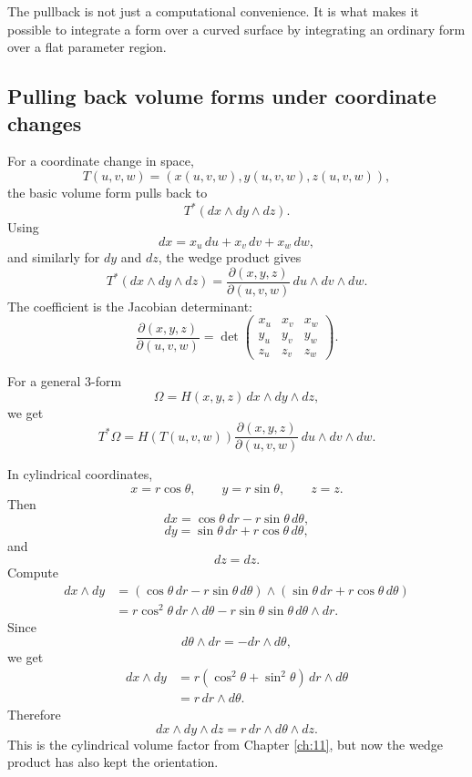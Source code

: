 The pullback is not just a computational convenience.  It is what makes it possible to
integrate a form over a curved surface by integrating an ordinary form over a flat
parameter region.

\subsection{Pulling back volume forms under coordinate changes}

For a coordinate change in space,
\[
    T(u,v,w)=(x(u,v,w),y(u,v,w),z(u,v,w)),
\]
the basic volume form pulls back to
\[
    T^*(dx\wedge dy\wedge dz).
\]
Using
\[
    dx=x_u\,du+x_v\,dv+x_w\,dw,
\]
and similarly for \(dy\) and \(dz\), the wedge product gives
\[
\boxed{
    T^*(dx\wedge dy\wedge dz)
    =
    \frac{\partial(x,y,z)}{\partial(u,v,w)}
    \,du\wedge dv\wedge dw.
}
\]
The coefficient is the Jacobian determinant:
\[
\boxed{
    \frac{\partial(x,y,z)}{\partial(u,v,w)}
    =
    \det
    \begin{pmatrix}
        x_u & x_v & x_w\\
        y_u & y_v & y_w\\
        z_u & z_v & z_w
    \end{pmatrix}.
}
\]

For a general \(3\)-form
\[
    \Omega=H(x,y,z)\,dx\wedge dy\wedge dz,
\]
we get
\[
\boxed{
    T^*\Omega
    =
    H(T(u,v,w))
    \frac{\partial(x,y,z)}{\partial(u,v,w)}
    \,du\wedge dv\wedge dw.
}
\]

\begin{example}
In cylindrical coordinates,
\[
    x=r\cos\theta,
    \qquad
    y=r\sin\theta,
    \qquad
    z=z.
\]
Then
\[
    dx=\cos\theta\,dr-r\sin\theta\,d\theta,
\]
\[
    dy=\sin\theta\,dr+r\cos\theta\,d\theta,
\]
and
\[
    dz=dz.
\]
Compute
\[
\begin{aligned}
    dx\wedge dy
    &=
    (\cos\theta\,dr-r\sin\theta\,d\theta)
    \wedge
    (\sin\theta\,dr+r\cos\theta\,d\theta)\\
    &=
    r\cos^2\theta\,dr\wedge d\theta
    -
    r\sin\theta\sin\theta\,d\theta\wedge dr.
\end{aligned}
\]
Since
\[
    d\theta\wedge dr=-dr\wedge d\theta,
\]
we get
\[
\begin{aligned}
    dx\wedge dy
    &=
    r(\cos^2\theta+\sin^2\theta)\,dr\wedge d\theta\\
    &=
    r\,dr\wedge d\theta.
\end{aligned}
\]
Therefore
\[
\boxed{
    dx\wedge dy\wedge dz
    =
    r\,dr\wedge d\theta\wedge dz.
}
\]
This is the cylindrical volume factor from Chapter \ref{ch:11}, but now the wedge
product has also kept the orientation.
\end{example}

